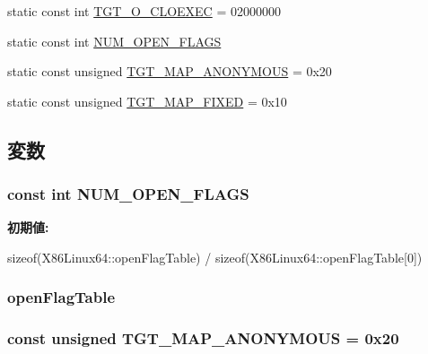 \begin{DoxyCompactItemize}
\item 
static const int \hyperlink{classX86Linux64_a34aa7ec867a12296e12a851c47fb56d4}{TGT\_\-O\_\-CLOEXEC} = 02000000
\item 
static const int \hyperlink{classX86Linux64_ad85b9918c8f2c8739537a002dc1dc526}{NUM\_\-OPEN\_\-FLAGS}
\item 
static const unsigned \hyperlink{classX86Linux64_a0bbc267200567dd98250b99b6085a499}{TGT\_\-MAP\_\-ANONYMOUS} = 0x20
\item 
static const unsigned \hyperlink{classX86Linux64_a0124e421d7846143bca15728b7a53e14}{TGT\_\-MAP\_\-FIXED} = 0x10
\end{DoxyCompactItemize}


\subsection{変数}
\hypertarget{classX86Linux64_ad85b9918c8f2c8739537a002dc1dc526}{
\subsubsection[{NUM\_\-OPEN\_\-FLAGS}]{\setlength{\rightskip}{0pt plus 5cm}const int {\bf NUM\_\-OPEN\_\-FLAGS}}}
\label{classX86Linux64_ad85b9918c8f2c8739537a002dc1dc526}
{\bfseries 初期値:}
\begin{DoxyCode}

        sizeof(X86Linux64::openFlagTable) /
        sizeof(X86Linux64::openFlagTable[0])
\end{DoxyCode}
\hypertarget{classX86Linux64_ab1db5a531609b99b262cc849ea24765a}{
\subsubsection[{openFlagTable}]{ {\bf openFlagTable}}}
\label{classX86Linux64_ab1db5a531609b99b262cc849ea24765a}
\hypertarget{classX86Linux64_a0bbc267200567dd98250b99b6085a499}{
\subsubsection[{TGT\_\-MAP\_\-ANONYMOUS}]{\setlength{\rightskip}{0pt plus 5cm}const unsigned {\bf TGT\_\-MAP\_\-ANONYMOUS} = 0x20}}

